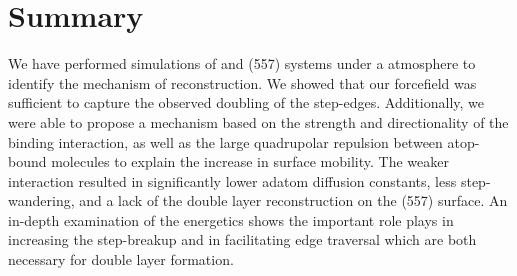 \section{Summary}
We have performed simulations of  and  (557) systems under a
 atmosphere to identify the mechanism of reconstruction. We showed that
our  forcefield was sufficient to capture the observed
doubling of the  step-edges. Additionally, we were able to propose a
mechanism based on the strength and directionality of the 
binding interaction, as well as the large quadrupolar repulsion between
atop-bound  molecules to explain the increase in surface mobility. The
weaker  interaction resulted in significantly lower adatom
diffusion constants, less step-wandering, and a lack of the double layer
reconstruction on the  (557) surface. An in-depth examination of the
energetics shows the important role  plays in increasing the
step-breakup and in facilitating edge traversal which are both necessary for
double layer formation.


%






